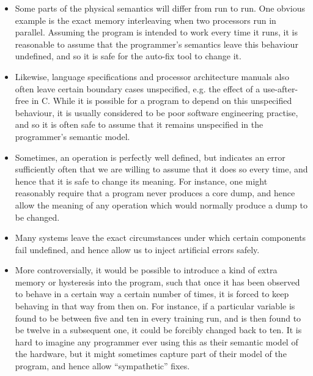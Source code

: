 \begin{itemize}
\item Some parts of the physical semantics will differ from run to
  run.  One obvious example is the exact memory interleaving when two
  processors run in parallel.  Assuming the program is intended to
  work every time it runs, it is reasonable to assume that the
  programmer's semantics leave this behaviour undefined, and so
  it is safe for the auto-fix tool to change it.

\item Likewise, language specifications and processor architecture
  manuals also often leave certain boundary cases unspecified,
  e.g. the effect of a use-after-free in C\cite{Kernighan1988}.  While
  it is possible for a program to depend on this unspecified
  behaviour, it is usually considered to be poor software engineering
  practise\cite{CWE758}, and so it is often safe to assume that it
  remains unspecified in the programmer's semantic model.

\item Sometimes, an operation is perfectly well defined, but indicates
  an error sufficiently often that we are willing to assume that it
  does so every time, and hence that it is safe to change its meaning.
  For instance, one might reasonably require that a program never
  produces a core dump, and hence allow the meaning of any operation
  which would normally produce a dump to be changed.

\item Many systems leave the exact circumstances under which certain
  components fail undefined, and hence allow us to inject artificial
  errors safely.

\item More controversially, it would be possible to introduce a kind
  of extra memory or hysteresis into the program, such that once it
  has been observed to behave in a certain way a certain number of
  times, it is forced to keep behaving in that way from then on.  For
  instance, if a particular variable is found to be between five and
  ten in every training run, and is then found to be twelve in a
  subsequent one, it could be forcibly changed back to ten.  It is
  hard to imagine any programmer ever using this as their semantic
  model of the hardware, but it might sometimes capture part of their
  model of the program, and hence allow ``sympathetic'' fixes.

\end{itemize}

